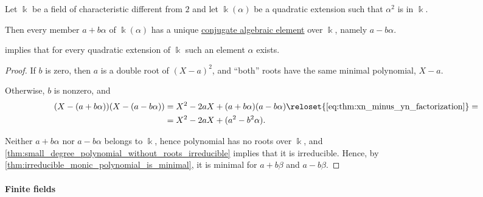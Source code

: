 \begin{proposition}\label{thm:quadratic_extension_conjugate}
  Let \( \Bbbk \) be a field of characteristic different from \( 2 \) and let \( \Bbbk(\alpha) \) be a quadratic extension such that \( \alpha^2 \) is in \( \Bbbk \).

  Then every member \( a + b\alpha \) of \( \Bbbk(\alpha) \) has a unique \hyperref[def:conjugate_algebraic_element]{conjugate algebraic element} over \( \Bbbk \), namely \( a - b\alpha \).
\end{proposition}
\begin{comments}
  \item {} implies that for every quadratic extension of \( \Bbbk \) such an element \( \alpha \) exists.
\end{comments}
\begin{proof}
  If \( b \) is zero, then \( a \) is a double root of \( (X - a)^2 \), and \enquote{both} roots have the same minimal polynomial, \( X - a \).

  Otherwise, \( b \) is nonzero, and
  \begin{align*}
    (X - (a + b \alpha)) (X - (a - b \alpha))
    &=
    X^2 - 2aX + (a + b \alpha) (a - b \alpha)
    \reloset {\eqref{eq:thm:xn_minus_yn_factorization}} = \\ &=
    X^2 - 2aX + (a^2 - b^2 \alpha).
  \end{align*}

  Neither \( a + b \alpha \) nor \( a - b \alpha \) belongs to \( \Bbbk \), hence polynomial has no roots over \( \Bbbk \), and \cref{thm:small_degree_polynomial_without_roots_irreducible} implies that it is irreducible. Hence, by \cref{thm:irreducible_monic_polynomial_is_minimal}, it is minimal for \( a + b \beta \) and \( a - b \beta \).
\end{proof}

\paragraph{Finite fields}

